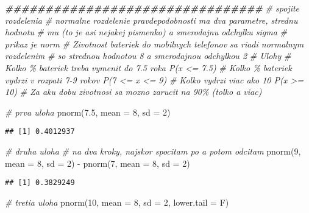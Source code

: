 \documentclass[
]{article}
\newenvironment{Shaded}{\begin{snugshade}}{\end{snugshade}}
\newcommand{\AttributeTok}[1]{\textcolor[rgb]{0.77,0.63,0.00}{#1}}
\newcommand{\CommentTok}[1]{\textcolor[rgb]{0.56,0.35,0.01}{\textit{#1}}}
\newcommand{\DecValTok}[1]{\textcolor[rgb]{0.00,0.00,0.81}{#1}}
\newcommand{\DocumentationTok}[1]{\textcolor[rgb]{0.56,0.35,0.01}{\textbf{\textit{#1}}}}
\newcommand{\FloatTok}[1]{\textcolor[rgb]{0.00,0.00,0.81}{#1}}
\newcommand{\FunctionTok}[1]{\textcolor[rgb]{0.00,0.00,0.00}{#1}}
\newcommand{\NormalTok}[1]{#1}
\newcommand{\SpecialCharTok}[1]{\textcolor[rgb]{0.00,0.00,0.00}{#1}}
\begin{document}
\begin{Shaded}
\begin{Highlighting}[]
\DocumentationTok{\#\#\#\#\#\#\#\#\#\#\#\#\#\#\#\#\#\#\#\#\#\#\#\#\#\#\#\#\#\#\#\#}
\CommentTok{\# spojite rozdelenia}
\CommentTok{\# normalne rozdelenie pravdepodobnosti ma dva parametre, strednu hodnotu}
\CommentTok{\# mu (to je asi nejakej pismenko) a smerodajnu odchylku sigma}
\CommentTok{\# prikaz je norm}
\CommentTok{\# Zivotnost bateriek do mobilnych telefonov sa riadi normalnym rozdelenim}
\CommentTok{\# so strednou hodnotou 8 a smerodajnou odchylkou 2}
\CommentTok{\# Ulohy}
\CommentTok{\# Kolko \% bateriek treba vymenit do 7.5 roka P(x \textless{}= 7.5)}
\CommentTok{\# Kolko \% bateriek vydrzi v rozpati 7{-}9 rokov P(7 \textless{}= x \textless{}= 9)}
\CommentTok{\# Kolko vydrzi viac ako 10 P(x \textgreater{}= 10)}
\CommentTok{\# Za aku dobu zivotnosi sa mozno zarucit na 90\% (tolko a viac)}

\CommentTok{\# prva uloha}
\FunctionTok{pnorm}\NormalTok{(}\FloatTok{7.5}\NormalTok{, }\AttributeTok{mean =} \DecValTok{8}\NormalTok{, }\AttributeTok{sd =} \DecValTok{2}\NormalTok{)}
\end{Highlighting}
\end{Shaded}

\begin{verbatim}
## [1] 0.4012937
\end{verbatim}

\begin{Shaded}
\begin{Highlighting}[]
\CommentTok{\# druha uloha}
\CommentTok{\# na dva kroky, najskor spocitam po a potom odcitam}
\FunctionTok{pnorm}\NormalTok{(}\DecValTok{9}\NormalTok{, }\AttributeTok{mean =} \DecValTok{8}\NormalTok{, }\AttributeTok{sd =} \DecValTok{2}\NormalTok{) }\SpecialCharTok{{-}} \FunctionTok{pnorm}\NormalTok{(}\DecValTok{7}\NormalTok{, }\AttributeTok{mean =} \DecValTok{8}\NormalTok{, }\AttributeTok{sd =} \DecValTok{2}\NormalTok{)}
\end{Highlighting}
\end{Shaded}

\begin{verbatim}
## [1] 0.3829249
\end{verbatim}

\begin{Shaded}
\begin{Highlighting}[]
\CommentTok{\# tretia uloha}
\FunctionTok{pnorm}\NormalTok{(}\DecValTok{10}\NormalTok{, }\AttributeTok{mean =} \DecValTok{8}\NormalTok{, }\AttributeTok{sd =} \DecValTok{2}\NormalTok{, }\AttributeTok{lower.tail =}\NormalTok{ F)}
\end{Highlighting}
\end{Shaded}
\end{document}
